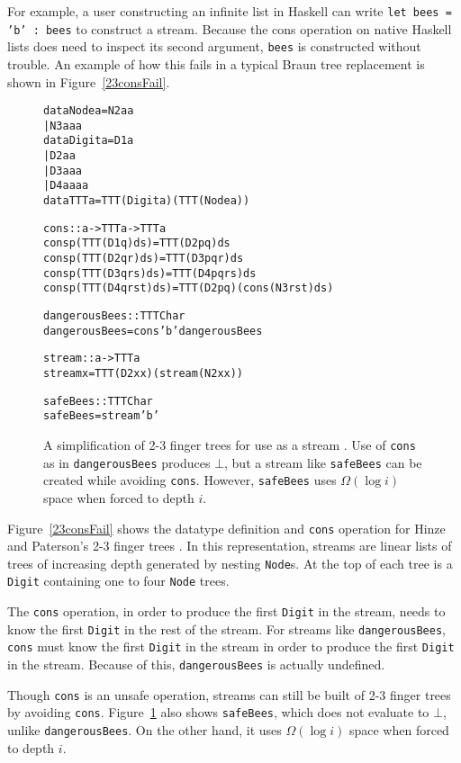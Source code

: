 \documentclass{llncs}
\begin{document}
For example, a user constructing an infinite list in Haskell can write {\tt let bees = 'b' : bees} to construct a stream.
Because the cons operation on native Haskell lists does need to inspect its second argument, {\tt bees} is constructed without trouble.
An example of how this fails in a typical Braun tree replacement is shown in Figure~\ref{23consFail}.

\begin{figure}
\begin{alltt}
data Node a = N2 a a
            | N3 a a a
data Digit a = D1 a
             | D2 a a
             | D3 a a a
             | D4 a a a a
data TTT a = TTT (Digit a) (TTT (Node a))

cons :: a -> TTT a -> TTT a
cons p (TTT (D1 q)       ds) = TTT (D2 p q) ds
cons p (TTT (D2 q r)     ds) = TTT (D3 p q r) ds
cons p (TTT (D3 q r s)   ds) = TTT (D4 p q r s) ds
cons p (TTT (D4 q r s t) ds) = TTT (D2 p q) (cons (N3 r s t) ds)

dangerousBees :: TTT Char
dangerousBees = cons 'b' dangerousBees

stream :: a -> TTT a
stream x = TTT (D2 x x) (stream (N2 x x))

safeBees :: TTT Char
safeBees = stream 'b'
\end{alltt}
\caption{
A simplification of 2-3 finger trees for use as a stream \cite{HinzePat}. 
Use of {\tt cons} as in {\tt dangerousBees} produces $\bot$, but a stream like {\tt safeBees} can be created while avoiding {\tt cons}.
However, {\tt safeBees} uses $\Omega(\log i)$ space when forced to depth $i$.
}
\label{23consFail}
\label{23stream}
\end{figure}

Figure~\ref{23consFail} shows the datatype definition and {\tt cons} operation for Hinze and Paterson's 2-3 finger trees \cite{HinzePat}.
In this representation, streams are linear lists of trees of increasing depth generated by nesting {\tt Node}s.
At the top of each tree is a {\tt Digit} containing one to four {\tt Node} trees.

The {\tt cons} operation, in order to produce the first {\tt Digit} in the stream, needs to know the first {\tt Digit} in the rest of the stream.
For streams like {\tt dangerousBees}, {\tt cons} must know the first {\tt Digit} in the stream in order to produce the first {\tt Digit} in the stream.
Because of this, {\tt dangerousBees} is actually undefined.

Though {\tt cons} is an unsafe operation, streams can still be built of 2-3 finger trees by avoiding {\tt cons}.
Figure~\ref{23stream} also shows {\tt safeBees}, which does not evaluate to $\bot$, unlike {\tt dangerousBees}.
On the other hand, it uses $\Omega(\log i)$ space when forced to depth $i$.
\end{document}
